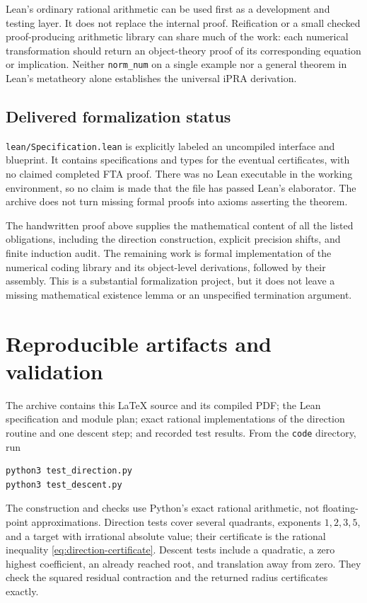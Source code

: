 \documentclass[11pt,letterpaper]{article}
\theoremstyle{definition}\newtheorem{definition}[theorem]{Definition}
\theoremstyle{remark}\newtheorem{remark}[theorem]{Remark}
\begin{document}
Lean's ordinary rational arithmetic can be used first as a development and
testing layer. It does not replace the internal proof. Reification or a
small checked proof-producing arithmetic library can share much of the
work: each numerical transformation should return an object-theory proof
of its corresponding equation or implication. Neither \texttt{norm\_num}
on a single example nor a general theorem in Lean's metatheory alone
establishes the universal iPRA derivation.

\subsection{Delivered formalization status}

\texttt{lean/Specification.lean} is explicitly labeled an uncompiled
interface and blueprint. It contains specifications and types for the
eventual certificates, with no claimed completed FTA proof. There was no
Lean executable in the working environment, so no claim is made that the
file has passed Lean's elaborator. The archive does not turn missing
formal proofs into axioms asserting the theorem.

The handwritten proof above supplies the mathematical content of all the
listed obligations, including the direction construction, explicit
precision shifts, and finite induction audit. The remaining work is
formal implementation of the numerical coding library and its object-level
derivations, followed by their assembly. This is a substantial formalization
project, but it does not leave a missing mathematical existence lemma or
an unspecified termination argument.

\section{Reproducible artifacts and validation}

The archive contains this LaTeX source and its compiled PDF; the Lean
specification and module plan; exact rational implementations of the
direction routine and one descent step; and recorded test results.
From the \texttt{code} directory, run
\begin{lstlisting}
python3 test_direction.py
python3 test_descent.py
\end{lstlisting}
The construction and checks use Python's exact rational arithmetic, not
floating-point approximations. Direction tests cover several quadrants,
exponents $1,2,3,5$, and a target with irrational absolute value; their
certificate is the rational inequality
\eqref{eq:direction-certificate}. Descent tests include a quadratic, a
zero highest coefficient, an already reached root, and translation away
from zero. They check the squared residual contraction and the returned
radius certificates exactly.
\end{document}
